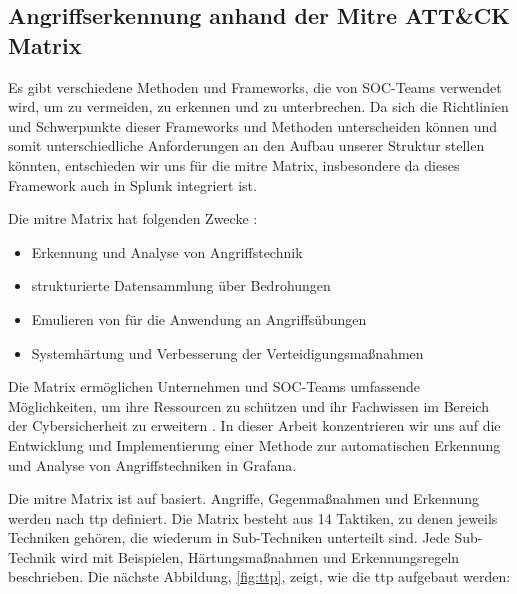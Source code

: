 \subsection{Angriffserkennung anhand der Mitre ATT\&CK Matrix}
Es gibt verschiedene Methoden und Frameworks, die von \gls{SOC}-Teams verwendet wird, um  zu vermeiden, zu erkennen und zu unterbrechen.  Da sich die Richtlinien und Schwerpunkte dieser Frameworks und Methoden unterscheiden können und somit unterschiedliche Anforderungen an den Aufbau unserer Struktur stellen könnten, entschieden wir uns für die \gls{mitre} Matrix, insbesondere da dieses Framework auch in Splunk integriert ist. 

Die \gls{mitre} Matrix hat folgenden Zwecke \citep{Mitre_Started}:

{
\begin{itemize}[noitemsep]
   \item Erkennung und Analyse von Angriffstechnik
   \item	strukturierte Datensammlung über Bedrohungen
   \item	Emulieren von  für die Anwendung an Angriffsübungen
   \item	Systemhärtung und Verbesserung der Verteidigungsmaßnahmen
\end{itemize}
}

Die Matrix ermöglichen Unternehmen und \gls{SOC}-Teams umfassende Möglichkeiten, um ihre Ressourcen zu schützen und ihr Fachwissen im Bereich der \gls{Cybersicherheit} zu erweitern \citep{Hazel_howtousemitre}. In dieser Arbeit konzentrieren wir uns auf die Entwicklung und Implementierung einer Methode zur automatischen Erkennung und Analyse von Angriffstechniken in Grafana.

Die \gls{mitre} Matrix ist auf  basiert. Angriffe, Gegenmaßnahmen und Erkennung werden nach \gls{ttp} definiert. Die Matrix besteht aus 14 Taktiken, zu denen jeweils Techniken gehören, die wiederum in Sub-Techniken unterteilt sind. Jede Sub-Technik wird mit Beispielen, Härtungsmaßnahmen und Erkennungsregeln beschrieben. Die nächste Abbildung, \ref{fig:ttp}, zeigt, wie die \gls{ttp} aufgebaut werden:

